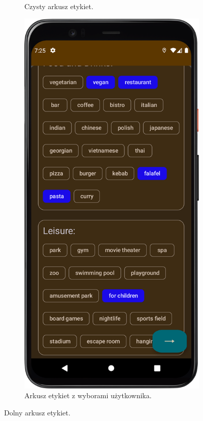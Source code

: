 \begin{figure}[H]
\begin{subfigure}[b]{0.38\textwidth}
                \caption{Czysty arkusz etykiet.\label{tags_empty}}
            \end{subfigure}
            \hfill
            \begin{subfigure}[b]{0.38\textwidth}
                \centering
                \includegraphics[width=\textwidth]{src/app/tags_selected.png}
                \caption{Arkusz etykiet z wyborami użytkownika.\label{tags_full}}
            \end{subfigure}
            \caption{Dolny arkusz etykiet.\label{tags}}
            \qquad
        \end{figure} 

